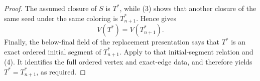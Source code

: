 \begin{proof}
The assumed closure of \(S\) is \(T^*\), while (3) shows that another
closure of the same seed under the same coloring is \(T^*_{n+1}\).
Hence  gives
\[
                         V(T^*)=V(T^*_{n+1}).                    \tag{4}
\]
Finally, the below-final field of the replacement
 presentation says that \(T^*\) is an exact
ordered initial segment of \(T^*_{n+1}\).  Apply
 to that initial-segment
relation and (4).  It identifies the full ordered vertex and exact-edge
data, and therefore yields \(T^*=T^*_{n+1}\), as required.
\end{proof}
